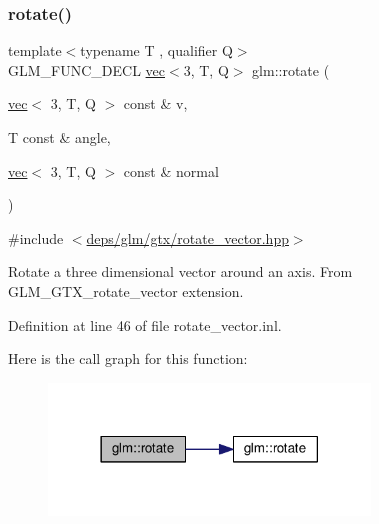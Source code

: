 \subsubsection{\texorpdfstring{rotate()}{rotate()}\hspace{0.1cm}{\footnotesize\ttfamily [2/3]}}
{\footnotesize\ttfamily template$<$typename T , qualifier Q$>$ \\
G\+L\+M\+\_\+\+F\+U\+N\+C\+\_\+\+D\+E\+CL \hyperlink{structglm_1_1vec}{vec}$<$3, T, Q$>$ glm\+::rotate (\begin{DoxyParamCaption}\item[{\hyperlink{structglm_1_1vec}{vec}$<$ 3, T, Q $>$ const \&}]{v,  }\item[{T const \&}]{angle,  }\item[{\hyperlink{structglm_1_1vec}{vec}$<$ 3, T, Q $>$ const \&}]{normal }\end{DoxyParamCaption})}



{\ttfamily \#include $<$\hyperlink{rotate__vector_8hpp}{deps/glm/gtx/rotate\+\_\+vector.\+hpp}$>$}

Rotate a three dimensional vector around an axis. From G\+L\+M\+\_\+\+G\+T\+X\+\_\+rotate\+\_\+vector extension. 

Definition at line 46 of file rotate\+\_\+vector.\+inl.

Here is the call graph for this function\+:
\nopagebreak
\begin{figure}[H]
\begin{center}
\leavevmode
\includegraphics[width=242pt]{df/d02/group__gtx__rotate__vector_ga1ba501ef83d1a009a17ac774cc560f21_cgraph}
\end{center}
\end{figure}
\mbox{\label{group__gtx__rotate__vector_ga1005f1267ed9c57faa3f24cf6873b961}} 
